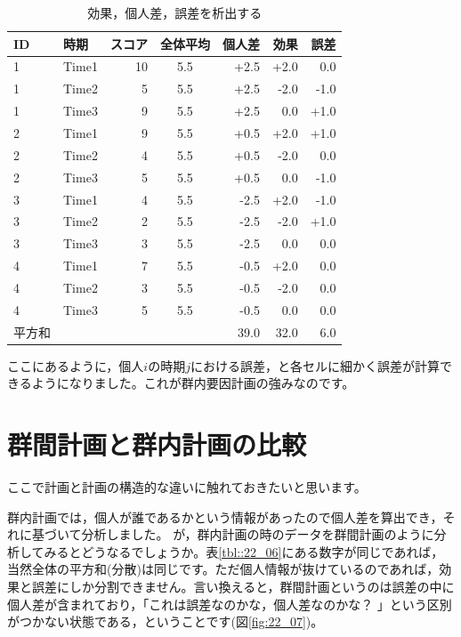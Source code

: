 \documentclass{ltjbook}
\begin{document}
\begin{table}[ht]
	\centering
	\caption{効果，個人差，誤差を析出する}
	\begin{tabular}{llrcrrr}
		\hline
		ID  & 時期    & スコア & 全体平均 & 個人差  & 効果   & 誤差   \\
		\hline
		1   & Time1 & 10  & 5.5  & +2.5 & +2.0 & 0.0  \\
		1   & Time2 & 5   & 5.5  & +2.5 & -2.0 & -1.0 \\
		1   & Time3 & 9   & 5.5  & +2.5 & 0.0  & +1.0 \\
		2   & Time1 & 9   & 5.5  & +0.5 & +2.0 & +1.0 \\
		2   & Time2 & 4   & 5.5  & +0.5 & -2.0 & 0.0  \\
		2   & Time3 & 5   & 5.5  & +0.5 & 0.0  & -1.0 \\
		3   & Time1 & 4   & 5.5  & -2.5 & +2.0 & -1.0 \\
		3   & Time2 & 2   & 5.5  & -2.5 & -2.0 & +1.0 \\
		3   & Time3 & 3   & 5.5  & -2.5 & 0.0  & 0.0  \\
		4   & Time1 & 7   & 5.5  & -0.5 & +2.0 & 0.0  \\
		4   & Time2 & 3   & 5.5  & -0.5 & -2.0 & 0.0  \\
		4   & Time3 & 5   & 5.5  & -0.5 & 0.0  & 0.0  \\
		\hline\hline
		平方和 &       &     &      & 39.0 & 32.0 & 6.0  \\\hline
	\end{tabular}
	\label{tbl::22_07}
\end{table}

ここにあるように，個人$i$の時期$j$における誤差，と各セルに細かく誤差が計算できるようになりました。これが群内要因計画の強みなのです。

\section{群間計画と群内計画の比較}
ここで計画と計画の構造的な違いに触れておきたいと思います。

群内計画では，個人が誰であるかという情報があったので個人差を算出でき，それに基づいて分析しました。
が，群内計画の時のデータを群間計画のように分析してみるとどうなるでしょうか。表\ref{tbl::22_06}にある数字が同じであれば，当然全体の平方和(分散)は同じです。ただ個人情報が抜けているのであれば，効果と誤差にしか分割できません。言い換えると，群間計画というのは誤差の中に個人差が含まれており，「これは誤差なのかな，個人差なのかな？ 」という区別がつかない状態である，ということです(図\ref{fig:22_07})。
\end{document}
